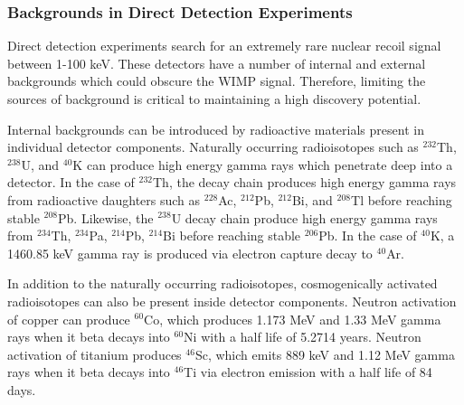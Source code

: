\subsubsection{Backgrounds in Direct Detection Experiments} \label{Backgrounds}

Direct detection experiments search for an extremely rare nuclear recoil signal between 1-100 keV.  These detectors have a number of internal and external backgrounds which could obscure the WIMP signal.  Therefore, limiting the sources of background is critical to maintaining a high discovery potential.  

Internal backgrounds can be introduced by radioactive materials present in individual detector components.  Naturally occurring radioisotopes such as $^{232}$Th, $^{238}$U, and $^{40}$K can produce high energy gamma rays which penetrate deep into a detector.  In the case of $^{232}$Th, the decay chain produces high energy gamma rays from radioactive daughters such as $^{228}$Ac, $^{212}$Pb, $^{212}$Bi, and $^{208}$Tl before reaching stable $^{208}$Pb.  Likewise, the $^{238}$U decay chain produce high energy gamma rays from $^{234}$Th, $^{234}$Pa, $^{214}$Pb, $^{214}$Bi before reaching stable $^{206}$Pb.  In the case of $^{40}$K, a 1460.85 keV gamma ray is produced via electron capture decay to $^{40}$Ar.  

In addition to the naturally occurring radioisotopes, cosmogenically activated radioisotopes can also be present inside detector components.  Neutron activation of copper can produce $^{60}$Co, which produces 1.173 MeV and 1.33 MeV gamma rays when it beta decays into $^{60}$Ni with a half life of 5.2714 years.  Neutron activation of titanium produces $^{46}$Sc, which emits 889 keV and 1.12 MeV gamma rays when it beta decays into $^{46}$Ti via electron emission with a half life of 84 days. 

